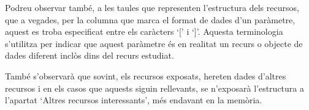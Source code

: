     Podreu observar també, a les taules que representen l'estructura dels recursos, que a vegades, per la columna que marca el format de dades d'un paràmetre, aquest es troba especificat entre els caràcters `[' i `]'. Aquesta terminologia s'utilitza per indicar que aquest paràmetre és en realitat un recurs o objecte de dades diferent inclòs dins del recurs estudiat.

    També s'observarà que sovint, els recursos exposats, hereten dades d'altres recursos i en els casos que aquests siguin rellevants, se n'exposarà l'estructura a l'apartat `Altres recursos interessants', més endavant en la memòria.

    
    
    

